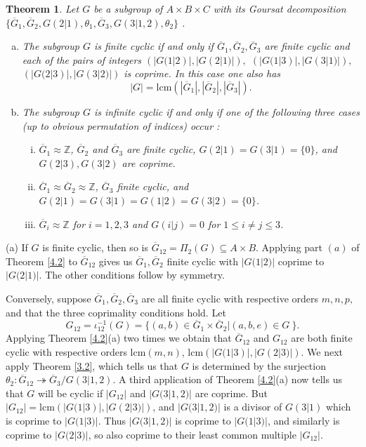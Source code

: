 \documentclass[11pt]{article}
\theoremstyle{change}
\newtheorem{Thm}{Theorem}[section]
\newcommand{\<}{\langle}
\renewcommand{\>}{\rangle}
\newcommand{\Proof} {\noindent{\itshape Proof.\quad }}
\begin{document}
\begin{Thm}
 Let $G$ be a subgroup of $A\times B\times C$  with its Goursat decomposition $\{ \overline{G}_1, \overline{G}_2, G(2|1), \theta_1, \overline{G}_3, G(3|1,2), \theta_2\}$ .
\begin{enumerate}[(a)]
 \item The subgroup $G$ is finite cyclic if and only if $\overline{G}_1,\overline{G}_2,\overline{G}_3$ are finite cyclic and each of the pairs of integers $(|G(1|2)|,|G(2|1)|),$ $(|G(1|3)|,|G(3|1)|),$ $(|G(2|3)|,|G(3|2)|)$ is coprime. In this case one also has $$|G|=\mbox{lcm}(|\overline{G}_1|,|\overline{G}_2|,|\overline{G}_3|).$$
\item The subgroup $G$ is infinite cyclic if and only if one of the following three cases (up to obvious permutation of indices) occur :
\begin{enumerate}[(i)]
\item  $\overline{G}_1\approx \mathbb{Z}$, $\overline{G}_2$ and $\overline{G}_3$ are finite cyclic, $G(2|1)=G(3|1)=\{0\}$, and $G(2|3),G(3|2)$ are coprime.
 \item $\overline{G}_1\approx \overline{G}_2\approx \mathbb{Z}$, $\overline{G}_3$ finite cyclic, and $G(2|1)=G(3|1)=G(1|2)=G(3|2)=\{0\}$.
\item $\overline{G}_i\approx \mathbb{Z}$ for $i=1,2,3$ and $G(i|j)=0$ for $1\leq i\neq j \leq 3$.
\end{enumerate}
\end{enumerate}
 \end{Thm}
\Proof
(a) If $G$ is finite cyclic, then so is $\overline{G}_{12}=\Pi_2(G)
\subseteq A\times B$. Applying part $(a)$ of Theorem \ref{4.2} to $\overline{G}_{12}$ gives us $\overline{G}_1, \overline{G}_2$ finite cyclic with $|G(1|2)|$ coprime to $|G(2|1)|$. The other conditions follow by symmetry.

Conversely, suppose $\overline{G}_1,\overline{G}_2,\overline{G}_3$ are all 
finite cyclic with respective orders $m,n,p,$ and that the three coprimality 
conditions hold. Let \[G_{12}=\iota^{-1}_{12}(G)=\{ (a,b)\in \overline{G}_1\times 
\overline{G}_2 | (a,b,e)\in G\ \}.\]  
Applying Theorem \ref{4.2}(a) two times we obtain that $\overline{G}_{12}$ and $G_{12}$ 
are both finite cyclic with respective orders $\mbox{lcm}(m,n)$, 
$\mbox{lcm}(|G(1|3)|,|G(2|3)|)$.  
We next  apply Theorem \ref{3.2}, which tells us that $G$ is determined by the 
surjection $\theta_2\colon \overline{G}_{12}\twoheadrightarrow \overline{G}_3/G(3|1,2)$.
A third application of Theorem \ref{4.2}(a) now tells us that $G$ will be cyclic 
if $|G_{12}|$ and $|G(3|1,2)|$ are coprime. But $|G_{12}|=\mbox{lcm}(|G(1|3)|,|G(2|3)|)$,  
and $|G(3|1,2)|$ is a divisor of $G(3|1)$ which is coprime to $|G(1|3)|$. 
Thus $|G(3|1,2)|$ is coprime to $|G(1|3)|$, and similarly is coprime to $|G(2|3)|$, 
so also coprime to their least common multiple $|G_{12}|$.
\end{document}
